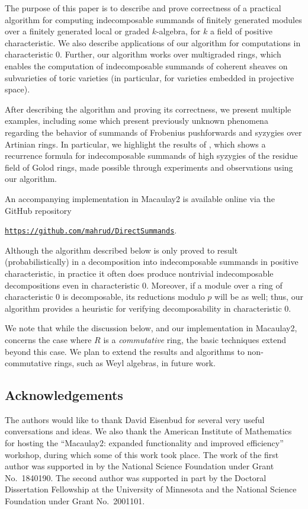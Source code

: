 \documentclass[12pt]{article}
\numberwithin{equation}{section}
\theoremstyle{theorem}
\numberwithin{thm}{section}
\theoremstyle{definition}
\begin{document}
The purpose of this paper is to describe and prove correctness of a practical algorithm for computing indecomposable summands of finitely generated modules over a finitely generated local or graded $k$-algebra, for $k$ a field of positive characteristic. We also describe applications of our algorithm for computations in characteristic 0. Further, our algorithm works over multigraded rings, which enables the computation of indecomposable summands of coherent sheaves on subvarieties of toric varieties (in particular, for varieties embedded in projective space).

After describing the algorithm and proving its correctness, we present multiple examples, including some which present previously unknown phenomena regarding the behavior of summands of Frobenius pushforwards and syzygies over Artinian rings. In particular, we highlight the results of \cite{CDE+24}, which shows a recurrence formula for indecomposable summands of high syzygies of the residue field of Golod rings, made possible through experiments and observations using our algorithm.

An accompanying implementation in Macaulay2 is available online via the GitHub repository \\
\centerline{
  \href{https://github.com/mahrud/DirectSummands}
  {\texttt{https://github.com/mahrud/DirectSummands}}.}


\begin{rem}
Although the algorithm described below is only proved to result (probabilistically) in a decomposition into indecomposable summands in positive characteristic, in practice it often does produce nontrivial indecomposable decompositions even in characteristic 0. Moreover, if a module over a ring of characteristic 0 is decomposable, its reductions modulo $p$ will be as well; thus, our algorithm provides a heuristic for verifying decomposability in characteristic 0.

  We note that while the discussion below, and our implementation in Macaulay2, concerns the case where $R$ is a \emph{commutative} ring, the basic techniques extend beyond this case. We plan to extend the results and algorithms to non-commutative rings, such as Weyl algebras, in future work.
\end{rem}



\subsection*{Acknowledgements}
The authors would like to thank David Eisenbud for several very useful conversations and ideas.
We also thank the American Institute of Mathematics for hosting the ``Macaulay2: expanded functionality and improved efficiency'' workshop, during which some of this work took place.
The work of the first author was supported in by the National Science Foundation under Grant No.~1840190.
The second author was supported in part by the Doctoral Dissertation Fellowship at the University of Minnesota and the National Science Foundation under Grant No.~2001101.
\end{document}
